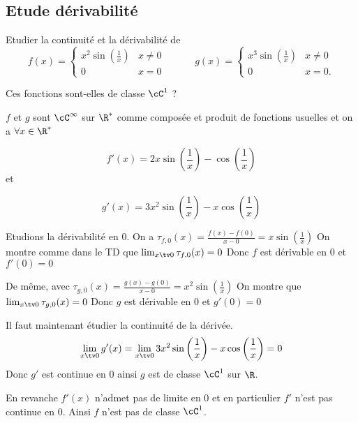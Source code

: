 \subsection{Etude dérivabilité }

\begin{exercice}   \;
Etudier la continuité et la dérivabilité de 
$$f(x)=\left\{\begin{array}{ll}
x^2\sin\left(\frac 1x\right)&x\neq 0\\
0&x=0
\end{array}\right.\quad\quad\quad
g(x)=\left\{\begin{array}{ll}
x^3\sin\left(\frac 1x\right)&x\neq 0\\
0&x=0.
\end{array}\right.$$

Ces fonctions sont-elles de classe $\cC^1$ ? 
\end{exercice}

\begin{correction}

$f$ et $g$ sont $\cC^\infty$ sur $\R^*$ comme composée et produit de fonctions usuelles et on a $\forall x\in \R^*$

$$f'(x) = 2x \sin\left(\frac 1x\right) -\cos\left(\frac 1x\right)$$
et 

$$g'(x) = 3x^2 \sin\left(\frac 1x\right) -x\cos\left(\frac 1x\right)$$


Etudions la dérivabilité en $0$. 
On  a $\tau_{f,0} (x)=\frac{f(x)-f(0)}{x-0}= x\sin\left(\frac 1x\right)$ 
On montre comme dans le TD que $\lim_{x\tv0}\tau_{f,0} (x) =0$
Donc $f$ est dérivable en $0$ et $f'(0)=0$

De même, avec 
$\tau_{g,0} (x)=\frac{g(x)-g(0)}{x-0}= x^2\sin\left(\frac 1x\right)$ 
On montre que $\lim_{x\tv0}\tau_{g,0} (x) =0$
Donc $g$ est dérivable en $0$ et $g'(0)=0$


Il faut maintenant étudier la continuité de  la dérivée. 
$$\lim_{x\tv 0} g'(x) = \lim_{x\tv 0}  3x^2 \sin\left(\frac 1x\right) -x\cos\left(\frac 1x\right) = 0$$
Donc $g'$ est continue en $0$  ainsi $g$ est de classe $\cC^1$ sur $\R$. 

En revanche $f'(x) $ n'admet pas de limite en $0$ et en particulier $f'$ n'est pas continue en $0$. Ainsi $f$ n'est  pas de classe $\cC^1$. 

\end{correction}